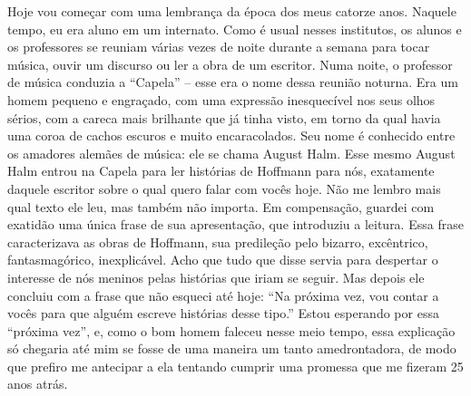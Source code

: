 Hoje vou começar com uma lembrança da época dos meus catorze anos.
Naquele tempo, eu era aluno em um internato. Como é usual nesses
institutos, os alunos e os professores se reuniam várias vezes de noite
durante a semana para tocar música, ouvir um discurso ou ler a obra de
um escritor. Numa noite, o professor de música conduzia a ``Capela'' --
esse era o nome dessa reunião noturna. Era um homem pequeno e engraçado,
com uma expressão inesquecível nos seus olhos sérios, com a careca mais
brilhante que já tinha visto, em torno da qual havia uma coroa de cachos
escuros e muito encaracolados. Seu nome é conhecido entre os amadores
alemães de música: ele se chama August Halm. Esse mesmo August Halm
entrou na Capela para ler histórias de  Hoffmann para nós,
exatamente daquele escritor sobre o qual quero falar com vocês hoje. Não
me lembro mais qual texto ele leu, mas também não importa. Em
compensação, guardei com exatidão uma única frase de sua apresentação,
que introduziu a leitura. Essa frase caracterizava as obras de Hoffmann,
sua predileção pelo bizarro, excêntrico, fantasmagórico, inexplicável.
Acho que tudo que disse servia para despertar o interesse de nós meninos
pelas histórias que iriam se seguir. Mas depois ele concluiu com a frase
que não esqueci até hoje: ``Na próxima vez, vou contar a vocês para que
alguém escreve histórias desse tipo.'' Estou esperando por essa
``próxima vez'', e, como o bom homem faleceu nesse meio tempo, essa
explicação só chegaria até mim se fosse de uma maneira um tanto
amedrontadora, de modo que prefiro me antecipar a ela tentando cumprir
uma promessa que me fizeram 25 anos atrás.

